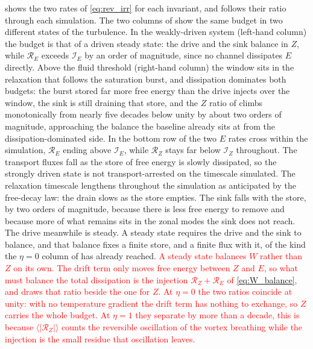 \documentclass{jpp}
\begin{document}
 shows the two rates of \cref{eq:rev_irr} for each invariant, and  follows their ratio through each simulation. The two columns of  show the same budget in two different states of the turbulence. In the weakly-driven system (left-hand column) the budget is that of a driven steady state: the drive and the sink balance in $Z$, while $\mathcal{R}_E$ exceeds $\mathcal{I}_E$ by an order of magnitude, since no channel dissipates $E$ directly. Above the fluid threshold (right-hand column) the window sits in the relaxation that follows the saturation burst, and dissipation dominates both budgets: the burst stored far more free energy than the drive injects over the window, the sink is still draining that store, and the $Z$ ratio of  climbs monotonically from nearly five decades below unity by about two orders of magnitude, approaching the balance the baseline already sits at from the dissipation-dominated side. In the bottom row of  the two $E$ rates cross within the simulation, $\mathcal{R}_E$ ending above $\mathcal{I}_E$, while $\mathcal{R}_Z$ stays far below $\mathcal{I}_Z$ throughout. The transport fluxes fall as the store of free energy is slowly dissipated, so the strongly driven state is not transport-arrested on the timescale simulated. The relaxation timescale lengthens throughout the simulation as anticipated by the free-decay law: the drain slows as the store empties. The sink falls with the store, by two orders of magnitude, because there is less free energy to remove and because more of what remains sits in the zonal modes the sink does not reach. The drive meanwhile is steady. A steady state requires the drive and the sink to balance, and that balance fixes a finite store, and a finite flux with it, of the kind the $\eta = 0$ column of  has already reached. \textcolor{red}{A steady state balances $W$ rather than $Z$ on its own. The drift term only moves free energy between $Z$ and $E$, so what must balance the total dissipation is the injection $\mathcal{R}_Z + \mathcal{R}_E$ of \cref{eq:W_balance}, and  draws that ratio beside the one for $Z$. At $\eta = 0$ the two ratios coincide at unity: with no temperature gradient the drift term has nothing to exchange, so $Z$ carries the whole budget. At $\eta = 1$ they separate by more than a decade, this is because $\langle|\mathcal{R}_Z|\rangle$ counts the reversible oscillation of the vortex breathing while the injection is the small residue that oscillation leaves.}
\end{document}

